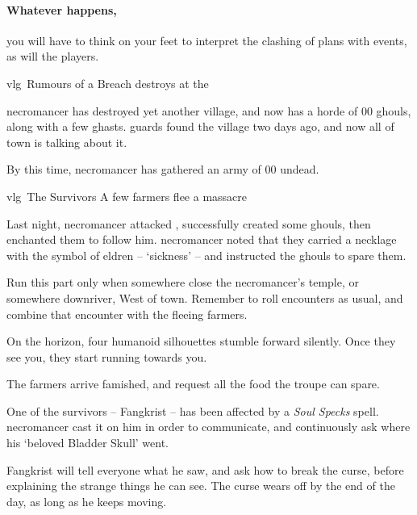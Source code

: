 \paragraph{Whatever happens,}
you will have to think on your feet to interpret the clashing of plans with events, as will the players.

{\gls{vlg}~\squash Rumours of a Breach}%
{ destroys  at the }%

\Gls{necromancer} has destroyed yet another \gls{village}, and now has a horde of 00 ghouls, along with a few ghasts.
\Glspl{guard} found the \gls{village} two days ago, and now all of \gls{town} is talking about it.

By this time, \gls{necromancer} has gathered an army of 00 undead.

{\gls{vlg}~The Survivors}%
{A few farmers flee a massacre}%

\begin{exampletext}
  Last night, \gls{necromancer} attacked , successfully created some ghouls, then enchanted them to follow him.
  \Gls{necromancer} noted that they carried a necklage with the symbol of \gls{eldren} -- `\gls{sickness}' -- and instructed the ghouls to spare them.
\end{exampletext}

Run this part only when somewhere close the \gls{necromancer}'s temple, or somewhere downriver, West of \gls{town}.
Remember to roll encounters as usual, and combine that encounter with the fleeing farmers.

\begin{boxtext}
  On the horizon, four humanoid silhouettes stumble forward silently.
  Once they see you, they start running towards you.
\end{boxtext}

The farmers arrive famished, and request all the food the troupe can spare.

One of the survivors -- Fangkrist -- has been affected by a \textit{Soul Specks} spell.
\Gls{necromancer} cast it on him in order to communicate, and continuously ask where his `beloved Bladder Skull' went.

Fangkrist will tell everyone what he saw, and ask how to break the curse, before explaining the strange things he can see.
The curse wears off by the end of the day, as long as he keeps moving.


